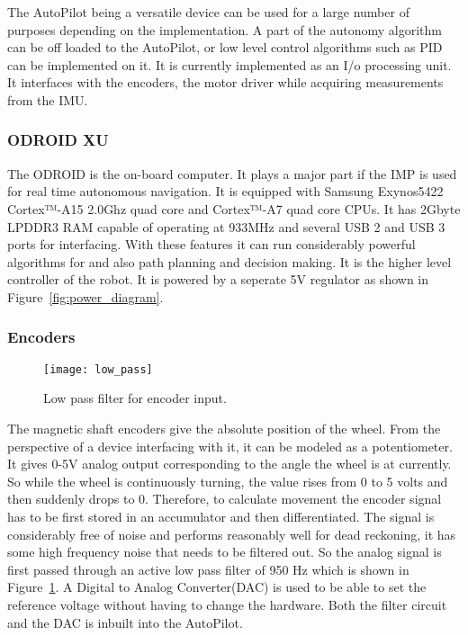 The AutoPilot being a versatile device can be used for a large number of purposes depending on the implementation. A part of the autonomy algorithm can be off loaded to the AutoPilot, or low level control algorithms such as PID can be implemented on it. It is currently implemented as an I/o processing unit. It interfaces with the encoders, the motor driver while acquiring measurements from the IMU.

\subsubsection{ODROID XU}

The ODROID is the on-board computer. It plays a major part if the IMP is used for real time autonomous navigation. It is equipped with Samsung Exynos5422 Cortex™-A15 2.0Ghz quad core and Cortex™-A7 quad core CPUs. It has 2Gbyte LPDDR3 RAM capable of operating at 933MHz and several USB 2 and USB 3 ports for interfacing. With these features it can run considerably powerful algorithms for \slam and also path planning and decision making. It is the higher level controller of the robot. It is powered by a seperate 5V regulator as shown in Figure~\ref{fig:power_diagram}.

\subsubsection{Encoders}
\begin{figure}[h]
\centering
\texttt{[image: low\_pass]}
\caption{Low pass filter for encoder input.}
\label{fig:low_pass}
\end{figure}
The magnetic shaft encoders give the absolute position of the wheel. From the perspective of a device interfacing with it, it can be modeled as a potentiometer. It gives 0-5V analog output corresponding to the angle the wheel is at currently. So while the wheel is continuously turning, the value rises from 0 to 5 volts and then suddenly drops to 0. Therefore, to calculate movement the encoder signal has to be first stored in an accumulator and then differentiated. The signal is considerably free of noise and performs reasonably well for dead reckoning, it has some high frequency noise that needs to be filtered out. So the analog signal is first passed through an active low pass filter of 950 Hz which is shown in Figure~\ref{fig:low_pass}. A Digital to Analog Converter(DAC) is used to be able to set the reference voltage without having to change the hardware. Both the filter circuit and the DAC is inbuilt into the AutoPilot.

